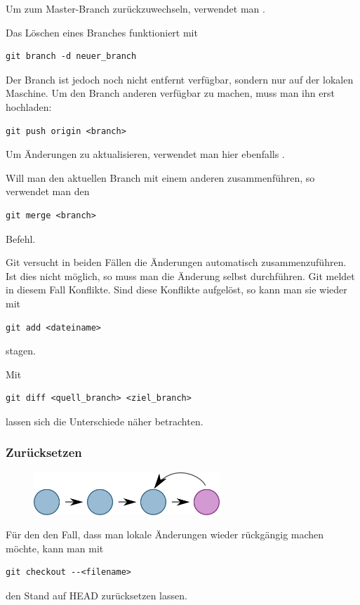 Um zum Master-Branch zurückzuwechseln, verwendet man .

Das Löschen eines Branches funktioniert mit
\begin{verbatim}
git branch -d neuer_branch
\end{verbatim}

Der Branch ist jedoch noch nicht entfernt verfügbar, sondern nur auf der lokalen Maschine.
Um den Branch anderen verfügbar zu machen, muss man ihn erst hochladen:
\begin{verbatim}
git push origin <branch>
\end{verbatim}

Um Änderungen zu aktualisieren, verwendet man hier ebenfalls .

Will man den aktuellen Branch mit einem anderen zusammenführen, so verwendet man den
\begin{verbatim}
git merge <branch>
\end{verbatim}
Befehl.

Git versucht in beiden Fällen die Änderungen automatisch zusammenzuführen.
Ist dies nicht möglich, so muss man die Änderung selbst durchführen.
Git meldet in diesem Fall Konflikte.
Sind diese Konflikte aufgelöst, so kann man sie wieder mit
\begin{verbatim}
git add <dateiname> 
\end{verbatim}
stagen.

Mit 
\begin{verbatim}
git diff <quell_branch> <ziel_branch>
\end{verbatim}
lassen sich die Unterschiede näher betrachten.

\subsubsection{Zurücksetzen}

\begin{figure}[htb]
\begin{center}
\includegraphics[width=7cm]{bilder/back.pdf}
\end{center} 
\end{figure}
Für den den Fall, dass man lokale Änderungen wieder rückgängig machen möchte, kann man mit
\begin{verbatim}
git checkout --<filename>
\end{verbatim}
den Stand auf HEAD zurücksetzen lassen.

